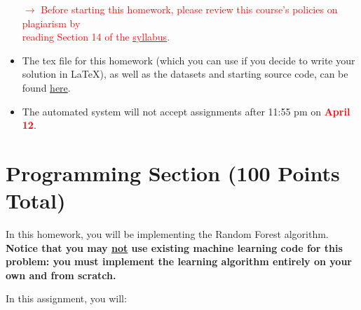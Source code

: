 \documentclass[letterpaper]{article}
\newcommand{\TODO}[1]{\textcolor{red}{\textbf{#1}}}
\begin{document}
\begin{itemize}
    \begin{center}
        \textcolor{red}{$\rightarrow$ Before starting this homework, please review this course's policies on plagiarism by  \\reading Section 14 of the \href{https://people.cs.umass.edu/~bsilva/courses/CMPSCI_589/Spring2023/S23_589_Syllabus.pdf\#page=4}{\textcolor{red}{\underline{syllabus}}}.}
    \end{center}
    \item The tex file for this homework (which you can use if you decide to write your solution in \LaTeX), as well as the datasets and starting source code, can be found \href{https://people.cs.umass.edu/~bsilva/courses/CMPSCI_589/Spring2023/homeworks/hw3.zip}{here}.
    \item The automated system will not accept assignments after 11:55 pm on \TODO{April 12}. 
\end{itemize}
\newpage

\vspace{1cm}
\section*{Programming Section (100 Points Total)}

In this homework, you will be implementing the Random Forest algorithm. \textbf{Notice that you may \ul{not} use existing machine learning code for this problem: you must implement the learning algorithm entirely on your own and from scratch.} 


In this assignment, you will:
\end{document}

